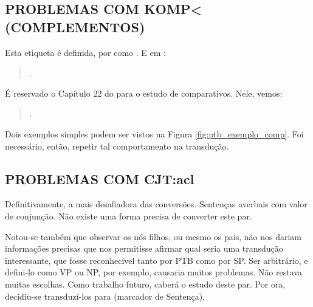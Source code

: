 \subsection{PROBLEMAS COM KOMP< (COMPLEMENTOS)}
\label{subsec:tag_komp}
Esta etiqueta é definida, por \cite[p~57]{afonso2006arvores} como . E em \cite[p~116]{afonso2006arvores}:
\begin{quote}
    .
\end{quote}

É reservado o Capítulo 22 do \cite[p~284]{bracketing_ptb} para o estudo de comparativos. Nele, vemos:
\begin{quote}
    .
\end{quote}

Dois exemplos simples podem ser vistos na Figura \ref{fig:ptb_exemplo_comp}. Foi necessário, então, repetir tal comportamento na transdução.
\begin{center}
    
\end{center}
\subsection{PROBLEMAS COM CJT:acl}
\label{subsec:CJT_acl}
Definitivamente, a mais desafiadora das conversões. Sentenças averbais com valor de conjunção. Não existe uma forma precisa de converter este par. 

Notou-se também que observar os nós filhos, ou mesmo os pais, não nos dariam informações precisas que nos permitisse afirmar qual seria uma transdução interessante, que fosse reconhecível tanto por PTB como por SP. Ser arbitrário, e defini-lo como VP ou NP, por exemplo, causaria muitos problemas. Não restava muitas escolhas. Como trabalho futuro, caberá o estudo deste par. Por ora, decidiu-se transduzí-los para  (marcador de Sentença).
